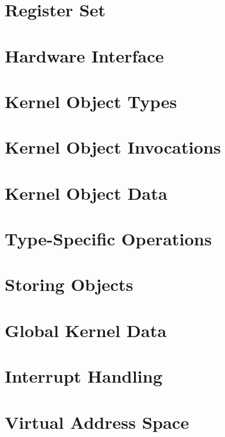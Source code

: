 \documentclass[a4paper,11pt,twoside]{report}
\begin{document}
\section{Register Set}


\section{Hardware Interface}


\section{Kernel Object Types}


\section{Kernel Object Invocations}


\section{Kernel Object Data}


\section{Type-Specific Operations}


\section{Storing Objects}


\section{Global Kernel Data}


\section{Interrupt Handling}


\section{Virtual Address Space}

\end{document}
